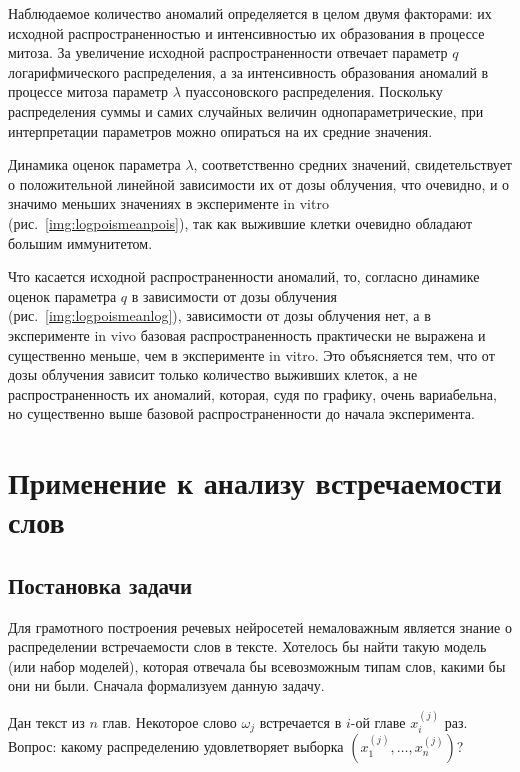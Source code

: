 \documentclass[12pt, specialist, subf, substylefile = spbu_report.rtx]{disser}
\begin{document}
	Наблюдаемое количество аномалий определяется в целом двумя факторами: их исходной распространенностью и интенсивностью их образования в процессе митоза. За увеличение исходной  распространенности отвечает параметр $q$ логарифмического распределения, а за интенсивность образования аномалий в процессе митоза параметр $\lambda$  пуассоновского распределения. Поскольку распределения  суммы и самих случайных величин однопараметрические, при интерпретации  параметров можно опираться на их средние значения.
	
	Динамика оценок параметра $\lambda$,  соответственно средних значений, свидетельствует о положительной линейной зависимости их от дозы облучения, что очевидно, и о значимо меньших значениях в эксперименте in vitro (рис.~\ref{img:logpoismeanpois}), так как выжившие клетки очевидно обладают большим иммунитетом. 
	
	Что касается исходной распространенности аномалий, то, согласно динамике оценок параметра $q$  в зависимости от дозы облучения (рис.~\ref{img:logpoismeanlog}), зависимости от дозы облучения нет, а в эксперименте in vivo базовая распространенность практически не выражена и существенно меньше, чем в эксперименте in vitro. Это объясняется тем, что от дозы облучения зависит только количество выживших клеток, а не распространенность их аномалий, которая, судя по графику,   очень вариабельна, но существенно выше базовой распространенности до начала эксперимента.
	
	\chapter{Применение к анализу встречаемости слов}
	
	\label{textanalysis}
	
	\section{Постановка задачи}
	
	Для грамотного построения речевых нейросетей немаловажным является знание о распределении встречаемости слов в тексте. Хотелось бы найти такую модель (или набор моделей), которая отвечала бы всевозможным типам слов, какими бы они ни были. Сначала формализуем данную задачу.
	
	Дан текст из $ n $ глав. Некоторое слово $ \omega _j $ встречается в $ i $-ой главе $ x ^{(j)} _i $ раз. Вопрос: какому распределению удовлетворяет выборка $ (x ^{(j)} _1, \dots, x ^{(j)} _n) $?
	
\end{document}
